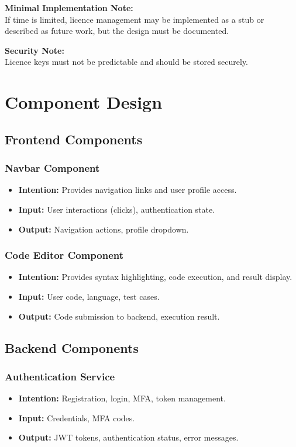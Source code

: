 \documentclass[a4paper, 11pt]{scrreprt}
\begin{document}
\textbf{Minimal Implementation Note:} \\
If time is limited, licence management may be implemented as a stub or described as future work, but the design must be documented.

\textbf{Security Note:} \\
Licence keys must not be predictable and should be stored securely.


\chapter{Component Design}

\section{Frontend Components}

\subsection{Navbar Component}
\begin{itemize}
    \item \textbf{Intention:} Provides navigation links and user profile access.
    \item \textbf{Input:} User interactions (clicks), authentication state.
    \item \textbf{Output:} Navigation actions, profile dropdown.
\end{itemize}


\subsection{Code Editor Component}
\begin{itemize}
    \item \textbf{Intention:} Provides syntax highlighting, code execution, and result display.
    \item \textbf{Input:} User code, language, test cases.
    \item \textbf{Output:} Code submission to backend, execution result.
\end{itemize}

\section{Backend Components}

\subsection{Authentication Service}
\begin{itemize}
    \item \textbf{Intention:} Registration, login, MFA, token management.
    \item \textbf{Input:} Credentials, MFA codes.
    \item \textbf{Output:} JWT tokens, authentication status, error messages.
\end{itemize}
\end{document}
